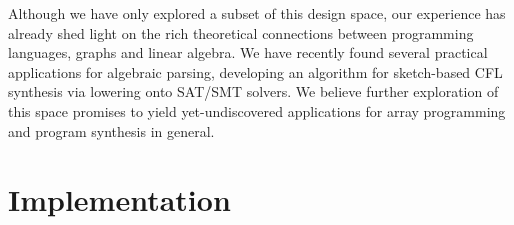 \documentclass[sigplan,10pt,review,anonymous]{acmart}
\begin{document}
\begin{table}[H]
  \captionsetup{font=tiny}
  \vspace{10pt}
\caption{Where ATG are algebraically typed graphs, CFGG is a context-free graph grammar, CP is a characteristic polynomial, STM is the subtyping machine, TLP is tabled logic programming, [G]ADTs are [generalized] algebraic data types, HOAS is higher order abstract syntax, KGs are knowledge graphs, NFs are Naperian functors, SQL is Structured Query Language, TCAH is a type class algebra hierarchy, and AE are algebraic expressions. Entries highlighted in gray have been concretized by our DSL.}
\end{table}
\vspace{-10pt}
Although we have only explored a subset of this design space, our experience has already shed light on the rich theoretical connections between programming languages, graphs and linear algebra. We have recently found several practical applications for algebraic parsing, developing an algorithm for sketch-based CFL synthesis via lowering onto SAT/SMT solvers. We believe further exploration of this space promises to yield yet-undiscovered applications for array programming and program synthesis in general.

\section{Implementation}
\end{document}

